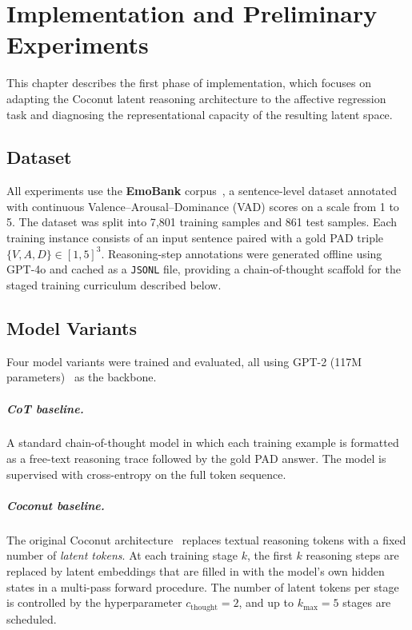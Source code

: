 \chapter{Implementation and Preliminary Experiments}

This chapter describes the first phase of implementation, which focuses on adapting the Coconut latent reasoning architecture to the affective regression task and diagnosing the representational capacity of the resulting latent space.

\section{Dataset}

All experiments use the \textbf{EmoBank} corpus~\cite{buechel-hahn-2017-emobank}, a sentence-level dataset annotated with continuous Valence--Arousal--Dominance (VAD) scores on a scale from 1 to 5.
The dataset was split into 7{,}801 training samples and 861 test samples.
Each training instance consists of an input sentence paired with a gold PAD triple $\{V, A, D\} \in [1,5]^3$.
Reasoning-step annotations were generated offline using GPT-4o and cached as a \texttt{JSONL} file, providing a chain-of-thought scaffold for the staged training curriculum described below.

\section{Model Variants}

Four model variants were trained and evaluated, all using GPT-2 (117M parameters)~\cite{radford2019language} as the backbone.

\paragraph{CoT baseline.}
A standard chain-of-thought model in which each training example is formatted as a free-text reasoning trace followed by the gold PAD answer.
The model is supervised with cross-entropy on the full token sequence.

\paragraph{Coconut baseline.}
The original Coconut architecture~\cite{hao2025traininglargelanguagemodels} replaces textual reasoning tokens with a fixed number of \emph{latent tokens}.
At each training stage $k$, the first $k$ reasoning steps are replaced by latent embeddings that are filled in with the model's own hidden states in a multi-pass forward procedure.
The number of latent tokens per stage is controlled by the hyperparameter $c_{\text{thought}} = 2$, and up to $k_{\max} = 5$ stages are scheduled.


